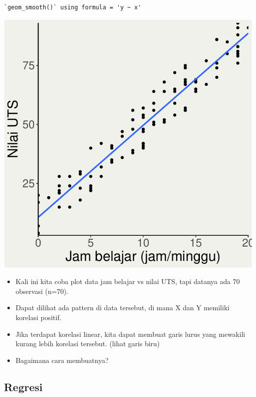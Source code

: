 \documentclass[
  letterpaper,
  DIV=11,
  numbers=noendperiod]{scrartcl}
\begin{document}
\begin{verbatim}
`geom_smooth()` using formula = 'y ~ x'
\end{verbatim}

\includegraphics{index_files/figure-pdf/unnamed-chunk-21-1.pdf}

\begin{itemize}
\item
  Kali ini kita coba plot data jam belajar vs nilai UTS, tapi datanya
  ada 70 observasi (n=70).
\item
  Dapat dilihat ada pattern di data tersebut, di mana X dan Y memiliki
  korelasi positif.
\item
  Jika terdapat korelasi linear, kita dapat membuat garis lurus yang
  mewakili kurang lebih korelasi tersebut. (lihat garis biru)
\item
  Bagaimana cara membuatnya?
\end{itemize}

\subsection{Regresi}\label{regresi-2}
\end{document}
